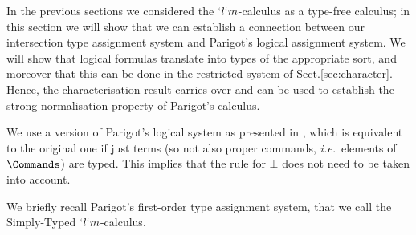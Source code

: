 \documentclass{lmcs}
\def\ie{\emph{i.e.}}
\begin{document}
In the previous sections we considered the $`l`m$-calculus as a type-free calculus; in this section we will show that we can establish a connection between our intersection type assignment system and Parigot's logical assignment system. 
We will show that logical formulas translate into types of the appropriate sort, and moreover that this can be done in the restricted system of Sect.\skp\ref{sec:character}. 
Hence, the characterisation result carries over and can be used to establish the strong normalisation property of Parigot's calculus.


We use a version of Parigot's logical system as presented in \cite{Parigot'92}, which is equivalent to the original one if just terms (so not also proper commands, \ie~elements of $\Commands$) are typed. This implies that the rule for $\bot$ does not need to be taken into account.%

We briefly recall Parigot's first-order type assignment system, that we call the Simply-Typed $`l`m$-calculus.
\end{document}
